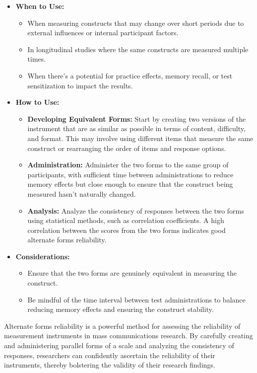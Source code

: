 \documentclass[
]{book}
\providecommand{\tightlist}{%
  \setlength{\itemsep}{0pt}\setlength{\parskip}{0pt}}
\begin{document}
\begin{itemize}
\tightlist
\item
  \textbf{When to Use:}

  \begin{itemize}
  \tightlist
  \item
    When measuring constructs that may change over short periods due to external influences or internal participant factors.
  \item
    In longitudinal studies where the same constructs are measured multiple times.
  \item
    When there's a potential for practice effects, memory recall, or test sensitization to impact the results.
  \end{itemize}
\item
  \textbf{How to Use:}

  \begin{itemize}
  \item
    \textbf{Developing Equivalent Forms:} Start by creating two versions of the instrument that are as similar as possible in terms of content, difficulty, and format. This may involve using different items that measure the same construct or rearranging the order of items and response options.
  \item
    \textbf{Administration:} Administer the two forms to the same group of participants, with sufficient time between administrations to reduce memory effects but close enough to ensure that the construct being measured hasn't naturally changed.
  \item
    \textbf{Analysis:} Analyze the consistency of responses between the two forms using statistical methods, such as correlation coefficients. A high correlation between the scores from the two forms indicates good alternate forms reliability.
  \end{itemize}
\item
  \textbf{Considerations:}

  \begin{itemize}
  \tightlist
  \item
    Ensure that the two forms are genuinely equivalent in measuring the construct.
  \item
    Be mindful of the time interval between test administrations to balance reducing memory effects and ensuring the construct stability.
  \end{itemize}
\end{itemize}

Alternate forms reliability is a powerful method for assessing the reliability of measurement instruments in mass communications research. By carefully creating and administering parallel forms of a scale and analyzing the consistency of responses, researchers can confidently ascertain the reliability of their instruments, thereby bolstering the validity of their research findings.
\end{document}

